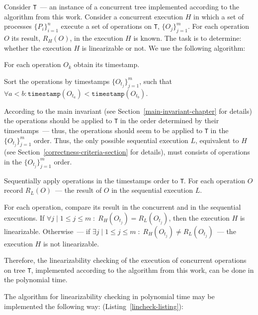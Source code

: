 \documentclass[times, dvipsnames,%
               languages={russian,english} %
              ]{itmo-student-thesis}
\begin{document}
Consider \texttt{T}~--- an instance of a concurrent tree implemented according to the algorithm from this work. Consider a concurrent execution $H$ in which a set of processes $\{P_i\}_{i = 1}^n$ execute a set of operations on \texttt{T}, $\{O_j\}_{j = 1}^m$. For each operation $O$ its result, $R_H(O)$, in the execution $H$ is known. The task is to determine: whether the execution $H$ is linearizable or not. We use the following algorithm:

\begin{nenum}
    \item For each operation $O_k$ obtain its timestamp.
    
    \item Sort the operations by timestamps $\{O_{t_j}\}_{j = 1}^m$, such that $\forall a < b: \texttt{timestamp}(O_{t_a}) < \texttt{timestamp}(O_{t_b})$.
    
    \item According to the main invariant (see Section~\ref{main-invariant-chapter} for details) the operations should be applied to \texttt{T} in the order determined by their timestamps~--- thus, the operations should seem to be applied to \texttt{T} in the $\{O_{t_j}\}_{j = 1}^m$ order. Thus, the only possible sequential execution $L$, equivalent to $H$ (see Section~\ref{correctness-criteria-section} for details), must consists of operations in the $\{O_{t_j}\}_{j = 1}^m$ order.
    
    \item Sequentially apply operations in the timestamps order to \texttt{T}. For each operation $O$ record $R_L(O)$~--- the result of $O$ in the sequential execution $L$.
    
    \item For each operation, compare its result in the concurrent and in the sequential executions. If $\forall j \; \vert \; 1 \leq j \leq m \; : \; R_H(O_{t_j}) = R_L(O_{t_j})$, then the execution $H$ is linearizable. Otherwise~--- if $\exists j \; \vert \; 1 \leq j \leq m \; : \; R_H(O_{t_j}) \neq R_L(O_{t_j})$~--- the execution $H$ is not linearizable.
\end{nenum}

\bigbreak

Therefore, the linearizability checking of the execution of concurrent operations on tree \texttt{T}, implemented according to the algorithm from this work, can be done in the polynomial time.

The algorithm for linearizability checking in polynomial time may be implemented the following way: (Listing~\ref{lincheck-listing}): 
    
\end{document}
